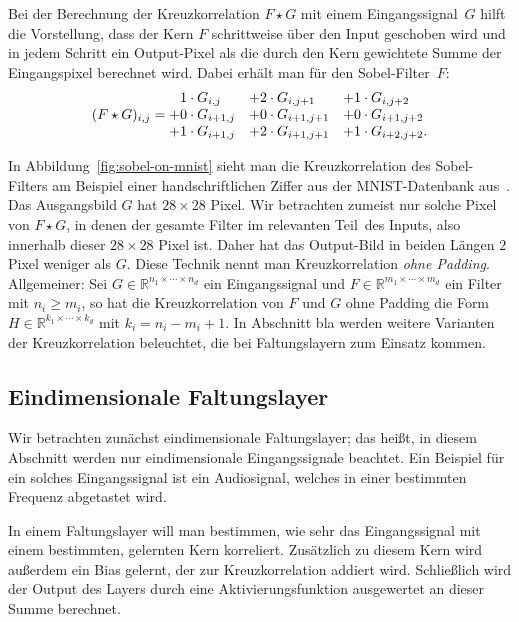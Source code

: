 \documentclass[paper=a4, 	%
		fontsize=11pt, 		%
		abstracton, 	%
		headsepline, 	%
		notitlepage	%
		]{scrartcl}
\theoremstyle{definition}
\newcommand{\R}{\mathbb{R}}
\newcommand{\todo}[1]{{\color{red} #1}}
\begin{document}
Bei der Berechnung der Kreuzkorrelation $F\star G$ mit einem Eingangssignal~$G$ hilft die Vorstellung, dass der Kern $F$ schrittweise über den Input geschoben wird und in jedem Schritt ein Output-Pixel als die durch den Kern gewichtete Summe der Eingangspixel berechnet wird.
Dabei erhält man für den Sobel-Filter~$F$:
\[
(F\star G)_{i,j} = \begin{matrix*}[l]
    \hphantom{+}1\cdot G_{i,j}  & + 2\cdot G_{i, j+1} & + 1\cdot G_{i, j+2} \\
    + 0\cdot G_{i+1, j} &+ 0\cdot G_{i+1, j+1} &+ 0\cdot G_{i+1, j+2} \\
    +1\cdot G_{i+1, j} &+ 2\cdot G_{i+1, j+1} &+ 1\cdot G_{i+2, j+2}.
    \end{matrix*}
\]

In Abbildung~\ref{fig:sobel-on-mnist} sieht man die Kreuzkorrelation des Sobel-Filters am Beispiel einer handschriftlichen Ziffer aus der MNIST-Datenbank aus~\cite{lecun2010mnist}.
Das Ausgangsbild $G$ hat $28\times 28$ Pixel.
Wir betrachten zumeist nur solche Pixel von $F\star G$, in denen der gesamte Filter im \glqq relevanten Teil\grqq\ des Inputs, also innerhalb dieser $28\times 28$ Pixel ist.
Daher hat das Output-Bild in beiden Längen $2$ Pixel weniger als $G$.
Diese Technik nennt man Kreuzkorrelation \emph{ohne Padding}.
Allgemeiner: Sei $G\in\R^{n_1\times\cdots \times n_d}$ ein Eingangssignal und $F\in\R^{m_1\times\cdots\times m_d}$ ein Filter mit $n_i \geq m_i$, so hat die Kreuzkorrelation von $F$ und $G$ ohne Padding die Form $H\in\R^{k_1\times\cdots\times k_d}$ mit $k_i = n_i - m_i + 1$. 
\todo{In Abschnitt bla werden weitere Varianten der Kreuzkorrelation beleuchtet, die bei Faltungslayern zum Einsatz kommen.}




\subsection{Eindimensionale Faltungslayer}

Wir betrachten zunächst eindimensionale Faltungslayer; das heißt, in diesem Abschnitt werden nur eindimensionale Eingangssignale beachtet.
Ein Beispiel für ein solches Eingangssignal ist ein Audiosignal, welches in einer bestimmten Frequenz abgetastet wird.

In einem Faltungslayer will man bestimmen, wie sehr das Eingangssignal mit einem bestimmten, gelernten Kern korreliert.
Zusätzlich zu diesem Kern wird außerdem ein Bias gelernt, der zur Kreuzkorrelation addiert wird.
Schließlich wird der Output des Layers durch eine Aktivierungsfunktion ausgewertet an dieser Summe berechnet.
\end{document}
